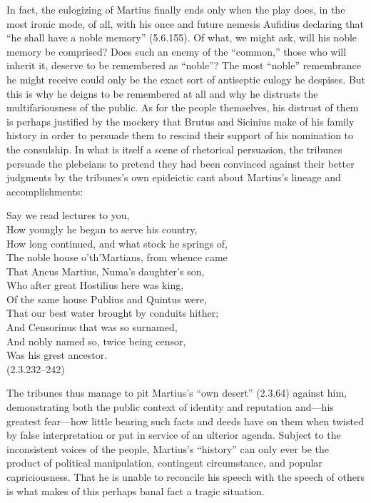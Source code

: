In fact, the eulogizing of Martius finally ends only when the play does, in the most ironic mode, of all, with his once and future nemesis Aufidius declaring that ``he shall have a noble memory'' (5.6.155).
Of what, we might ask, will his noble memory be comprised?
Does such an enemy of the ``common,'' those who will inherit it, deserve to be remembered as ``noble''?
The most ``noble'' remembrance he might receive could only be the exact sort of antiseptic eulogy he despises.
But this is why he deigns to be remembered at all and why he distrusts the multifariousness of the public.
As for the people themselves, his distrust of them is perhaps justified by the mockery that Brutus and Sicinius make of his family history in order to persuade them to rescind their support of his nomination to the consulship.
In what is itself a scene of rhetorical persuasion, the tribunes persuade the plebeians to pretend they had been convinced against their better judgments by the tribunes's own epideictic cant about Martius's lineage and accomplishments:
\begin{vq}
Say we read lectures to you,\\
How youngly he began to serve his country,\\
How long continued, and what stock he springs of,\\
The noble house o'th'Martians, from whence came\\
That Ancus Martius, Numa's daughter's son,\\
Who after great Hostilius here was king,\\
Of the same house Publius and Quintus were,\\
That our best water brought by conduits hither;\\
And Censorinus that was so surnamed,\\
And nobly named so, twice being censor,\\
Was his grest ancestor.\\
\hfill(2.3.232--242)
\end{vq}
The tribunes thus manage to pit Martius's ``own desert'' (2.3.64) against him, demonstrating both the public context of identity and reputation and---his greatest fear---how little bearing such facts and deeds have on them when twisted by false interpretation or put in service of an ulterior agenda.
Subject to the inconsistent voices of the people, Martius's ``history'' can only ever be the product of political manipulation, contingent circumstance, and popular capriciousness.
That he is unable to reconcile his speech with the speech of others is what makes of this perhaps banal fact a tragic situation.
